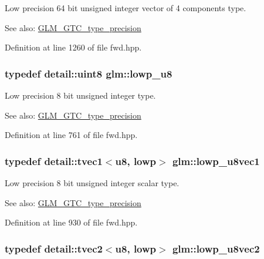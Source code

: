Low precision 64 bit unsigned integer vector of 4 components type. \begin{Desc}
\item[See also:]\hyperlink{group__gtc__type__precision}{GLM\_\-GTC\_\-type\_\-precision} \end{Desc}


Definition at line 1260 of file fwd.hpp.\hypertarget{group__gtc__type__precision_ge63f942c49a30dbf266b2f13f3efe257}{
\subsubsection[lowp\_\-u8]{\setlength{\rightskip}{0pt plus 5cm}typedef detail::uint8 {\bf glm::lowp\_\-u8}}}
\label{group__gtc__type__precision_ge63f942c49a30dbf266b2f13f3efe257}


Low precision 8 bit unsigned integer type. \begin{Desc}
\item[See also:]\hyperlink{group__gtc__type__precision}{GLM\_\-GTC\_\-type\_\-precision} \end{Desc}


Definition at line 761 of file fwd.hpp.\hypertarget{group__gtc__type__precision_gee3cba2c93fa8cb7295671908995197c}{
\subsubsection[lowp\_\-u8vec1]{\setlength{\rightskip}{0pt plus 5cm}typedef detail::tvec1$<$u8, lowp$>$ {\bf glm::lowp\_\-u8vec1}}}
\label{group__gtc__type__precision_gee3cba2c93fa8cb7295671908995197c}


Low precision 8 bit unsigned integer scalar type. \begin{Desc}
\item[See also:]\hyperlink{group__gtc__type__precision}{GLM\_\-GTC\_\-type\_\-precision} \end{Desc}


Definition at line 930 of file fwd.hpp.\hypertarget{group__gtc__type__precision_g8e5a056cbbcb70dca5c65950fa13a787}{
\subsubsection[lowp\_\-u8vec2]{\setlength{\rightskip}{0pt plus 5cm}typedef detail::tvec2$<$u8, lowp$>$ {\bf glm::lowp\_\-u8vec2}}}
\label{group__gtc__type__precision_g8e5a056cbbcb70dca5c65950fa13a787}


